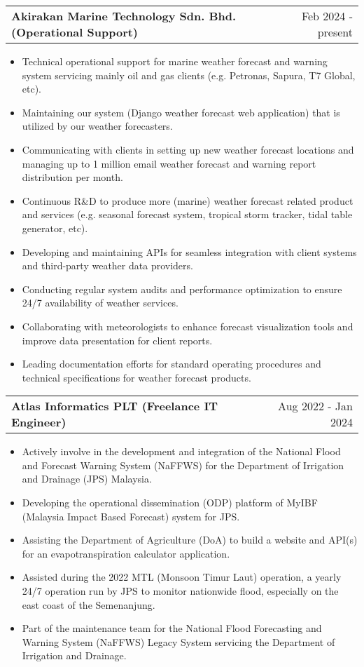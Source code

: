 \documentclass[a4paper,12pt]{article}
\makeatletter
\newenvironment{joblong}[2]
    {
    \begin{tabularx}{\linewidth}{@{}l X r@{}}
    \textbf{#1} & \hfill &  #2 \\[3.75pt]
    \end{tabularx}
    \begin{minipage}[t]{\linewidth}
    \begin{itemize}[nosep,after=\strut, leftmargin=1em, itemsep=3pt,label=--]
    }
    {
    \end{itemize}
    \end{minipage}    
    }
\makeatother
\begin{document}
\begin{joblong}{Akirakan Marine Technology Sdn. Bhd. (Operational Support)}{Feb 2024 - present}
\item Technical operational support for marine weather forecast and warning system servicing mainly oil and gas clients (e.g. Petronas, Sapura, T7 Global, etc).
\item Maintaining our system (Django weather forecast web application) that is utilized by our weather forecasters.
\item Communicating with clients in setting up new weather forecast locations and managing up to 1 million email weather forecast and warning report distribution per month.
\item Continuous R\&D to produce more (marine) weather forecast related product and services (e.g. seasonal forecast system, tropical storm tracker, tidal table generator, etc).
\item Developing and maintaining APIs for seamless integration with client systems and third-party weather data providers.
\item Conducting regular system audits and performance optimization to ensure 24/7 availability of weather services.
\item Collaborating with meteorologists to enhance forecast visualization tools and improve data presentation for client reports.
\item Leading documentation efforts for standard operating procedures and technical specifications for weather forecast products.
\end{joblong}

\begin{joblong}{Atlas Informatics PLT (Freelance IT Engineer)}{Aug 2022 - Jan 2024}
\item Actively involve in the development and integration of the National Flood and Forecast Warning System (NaFFWS) for the Department of Irrigation and Drainage (JPS) Malaysia.
\item Developing the operational dissemination (ODP) platform of MyIBF (Malaysia Impact Based Forecast) system for JPS.
\item Assisting the Department of Agriculture (DoA) to build a website and API(s) for an evapotranspiration calculator application.
\item Assisted during the 2022 MTL (Monsoon Timur Laut) operation, a yearly 24/7 operation run by JPS to monitor nationwide flood, especially on the east coast of the Semenanjung.
\item Part of the maintenance team for the National Flood Forecasting and Warning System (NaFFWS) Legacy System servicing the Department of Irrigation and Drainage.
\end{joblong}
\end{document}
